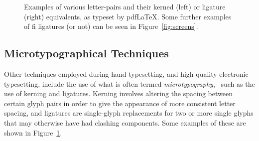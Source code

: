 \begin{figure}
 \caption[Examples of microtypographical techniques]{Examples of various letter-pairs and their kerned (left) or ligature (right) equivalents, as typeset by pdf\LaTeX{}. Some further examples of fi ligatures (or not) can be seen in Figure~\ref{fig:screens}.}
 \label{fig:kern-lig}
\end{figure}


\subsection{Microtypographical Techniques}
\label{sec:microtypography}
Other techniques employed during hand-type\-set\-t\-ing, and high-qua\-l\-ity electronic typesetting, include the use of what is often termed \emph{micro\-typo\-graphy},~\cite{Hurst2009} such as the use of kerning and ligatures. Kerning involves altering the spacing between certain glyph pairs in order to give the appearance of more consistent letter spacing, and ligatures are sin\-gle-glyph replacements for two or more single glyphs that may otherwise have had clashing components. Some examples of these are shown in Figure~\ref{fig:kern-lig}.


